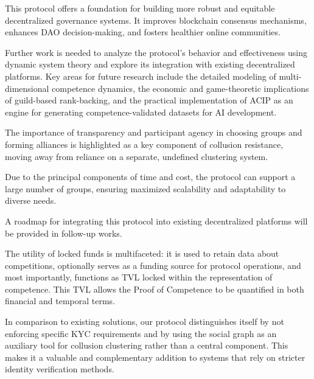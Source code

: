 \documentclass{article}
\begin{document}
\begin{CJK}{UTF8}{gbsn}
        This protocol offers a foundation for building more robust and equitable decentralized governance systems. It improves blockchain consensus mechanisms, enhances DAO decision-making, and fosters healthier online communities.

        Further work is needed to analyze the protocol's behavior and effectiveness using dynamic system theory and explore its integration with existing decentralized platforms. {{Key areas for future research include the detailed modeling of multi-dimensional competence dynamics, the economic and game-theoretic implications of guild-based rank-backing, and the practical implementation of ACIP as an engine for generating competence-validated datasets for AI development.}}

        The importance of transparency and participant agency in choosing groups and forming alliances is highlighted as a key component of collusion resistance, moving away from reliance on a separate, undefined clustering system.

        Due to the principal components of time and cost, the protocol can support a large number of groups, ensuring maximized scalability and adaptability to diverse needs.

        A roadmap for integrating this protocol into existing decentralized platforms will be provided in follow-up works.

        The utility of locked funds is multifaceted: it is used to retain data about competitions, optionally serves as a funding source for protocol operations, and most importantly, functions as TVL locked within the representation of competence. This TVL allows the Proof of Competence to be quantified in both financial and temporal terms.

        In comparison to existing solutions, our protocol distinguishes itself by not enforcing specific KYC requirements and by using the social graph as an auxiliary tool for collusion clustering rather than a central component. This makes it a valuable and complementary addition to systems that rely on stricter identity verification methods.


\end{CJK}
\end{document}
